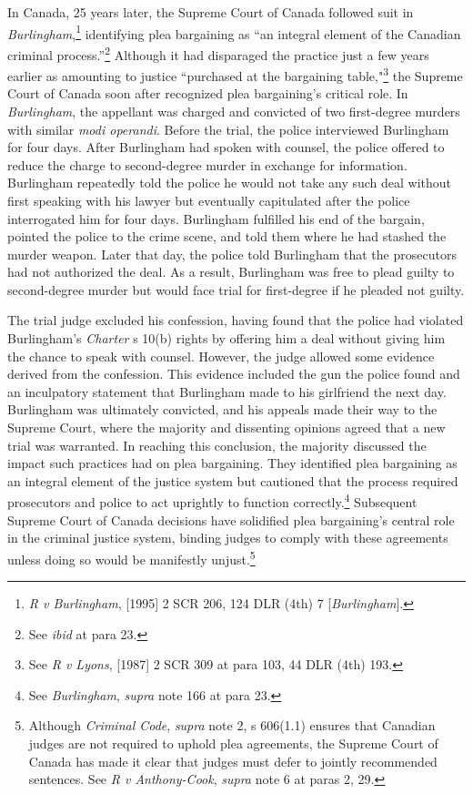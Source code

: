 In Canada, 25 years later, the Supreme Court of Canada followed suit in \textit{Burlingham},\footnote{\textit{R v Burlingham}, [1995] 2 SCR 206, 124 DLR (4th) 7 [\textit{Burlingham}].} identifying plea bargaining as ``an integral element of the Canadian criminal process.''\footnote{See \textit{ibid} at para 23.} Although it had disparaged the practice just a few years earlier as amounting to justice ``purchased at the bargaining table,"\footnote{See \textit{R v Lyons}, [1987] 2 SCR 309 at para 103, 44 DLR (4th) 193.} the Supreme Court of Canada soon after recognized plea bargaining's critical role. In \textit{Burlingham}, the appellant was charged and convicted of two first-degree murders with similar \textit{modi operandi}. Before the trial, the police interviewed Burlingham for four days. After Burlingham had spoken with counsel, the police offered to reduce the charge to second-degree murder in exchange for information. Burlingham repeatedly told the police he would not take any such deal without first speaking with his lawyer but eventually capitulated after the police interrogated him for four days. Burlingham fulfilled his end of the bargain, pointed the police to the crime scene, and told them where he had stashed the murder weapon. Later that day, the police told Burlingham that the prosecutors had not authorized the deal. As a result, Burlingham was free to plead guilty to second-degree murder but would face trial for first-degree if he pleaded not guilty.

The trial judge excluded his confession, having found that the police had violated Burlingham's \textit{Charter} s 10(b) rights by offering him a deal without giving him the chance to speak with counsel. However, the judge allowed some evidence derived from the confession. This evidence included the gun the police found and an inculpatory statement that Burlingham made to his girlfriend the next day. Burlingham was ultimately convicted, and his appeals made their way to the Supreme Court, where the majority and dissenting opinions agreed that a new trial was warranted. In reaching this conclusion, the majority discussed the impact such practices had on plea bargaining. They identified plea bargaining as an integral element of the justice system but cautioned that the process required prosecutors and police to act uprightly to function correctly.\footnote{See \textit{Burlingham}, \textit{supra} note 166 at para 23.} Subsequent Supreme Court of Canada decisions have solidified plea bargaining's central role in the criminal justice system, binding judges to comply with these agreements unless doing so would be manifestly unjust.\footnote{Although \textit{Criminal Code}, \textit{supra} note 2, s 606(1.1) ensures that Canadian judges are not required to uphold plea agreements, the Supreme Court of Canada has made it clear that judges must defer to jointly recommended sentences. See \textit{R v Anthony-Cook}, \textit{supra} note 6 at paras 2, 29.}

